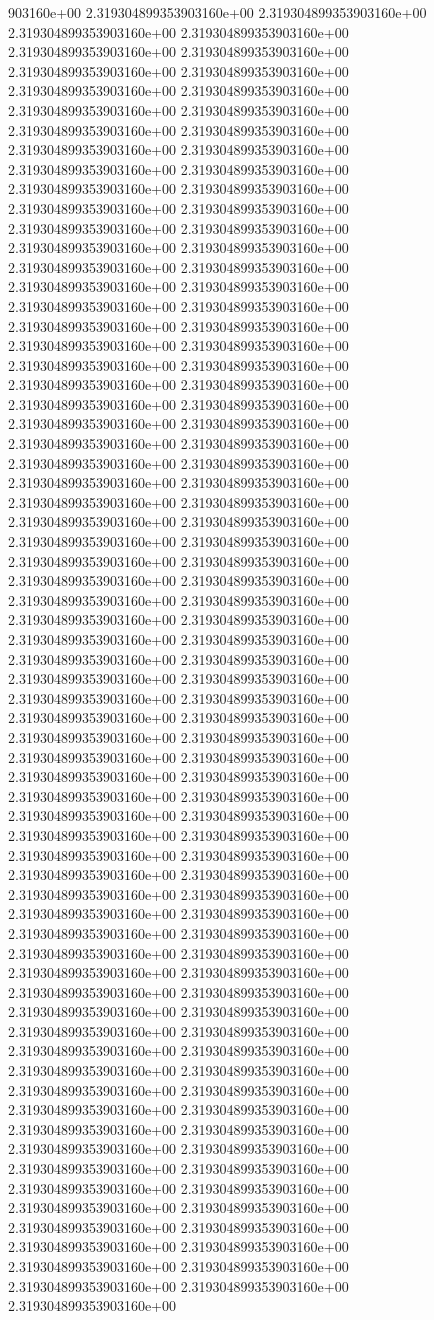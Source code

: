 903160e+00	2.319304899353903160e+00	2.319304899353903160e+00	2.319304899353903160e+00	2.319304899353903160e+00	2.319304899353903160e+00	2.319304899353903160e+00	2.319304899353903160e+00	2.319304899353903160e+00	2.319304899353903160e+00	2.319304899353903160e+00	2.319304899353903160e+00	2.319304899353903160e+00	2.319304899353903160e+00	2.319304899353903160e+00	2.319304899353903160e+00	2.319304899353903160e+00	2.319304899353903160e+00	2.319304899353903160e+00	2.319304899353903160e+00	2.319304899353903160e+00	2.319304899353903160e+00	2.319304899353903160e+00	2.319304899353903160e+00	2.319304899353903160e+00	2.319304899353903160e+00	2.319304899353903160e+00	2.319304899353903160e+00	2.319304899353903160e+00	2.319304899353903160e+00	2.319304899353903160e+00	2.319304899353903160e+00	2.319304899353903160e+00	2.319304899353903160e+00	2.319304899353903160e+00	2.319304899353903160e+00	2.319304899353903160e+00	2.319304899353903160e+00	2.319304899353903160e+00	2.319304899353903160e+00	2.319304899353903160e+00	2.319304899353903160e+00	2.319304899353903160e+00	2.319304899353903160e+00	2.319304899353903160e+00	2.319304899353903160e+00	2.319304899353903160e+00	2.319304899353903160e+00	2.319304899353903160e+00	2.319304899353903160e+00	2.319304899353903160e+00	2.319304899353903160e+00	2.319304899353903160e+00	2.319304899353903160e+00	2.319304899353903160e+00	2.319304899353903160e+00	2.319304899353903160e+00	2.319304899353903160e+00	2.319304899353903160e+00	2.319304899353903160e+00	2.319304899353903160e+00	2.319304899353903160e+00	2.319304899353903160e+00	2.319304899353903160e+00	2.319304899353903160e+00	2.319304899353903160e+00	2.319304899353903160e+00	2.319304899353903160e+00	2.319304899353903160e+00	2.319304899353903160e+00	2.319304899353903160e+00	2.319304899353903160e+00	2.319304899353903160e+00	2.319304899353903160e+00	2.319304899353903160e+00	2.319304899353903160e+00	2.319304899353903160e+00	2.319304899353903160e+00	2.319304899353903160e+00	2.319304899353903160e+00	2.319304899353903160e+00	2.319304899353903160e+00	2.319304899353903160e+00	2.319304899353903160e+00	2.319304899353903160e+00	2.319304899353903160e+00	2.319304899353903160e+00	2.319304899353903160e+00	2.319304899353903160e+00	2.319304899353903160e+00	2.319304899353903160e+00	2.319304899353903160e+00	2.319304899353903160e+00	2.319304899353903160e+00	2.319304899353903160e+00	2.319304899353903160e+00	2.319304899353903160e+00	2.319304899353903160e+00	2.319304899353903160e+00	2.319304899353903160e+00	2.319304899353903160e+00	2.319304899353903160e+00	2.319304899353903160e+00	2.319304899353903160e+00	2.319304899353903160e+00	2.319304899353903160e+00	2.319304899353903160e+00	2.319304899353903160e+00	2.319304899353903160e+00	2.319304899353903160e+00	2.319304899353903160e+00	2.319304899353903160e+00	2.319304899353903160e+00	2.319304899353903160e+00	2.319304899353903160e+00	2.319304899353903160e+00	2.319304899353903160e+00	2.319304899353903160e+00	2.319304899353903160e+00	2.319304899353903160e+00	2.319304899353903160e+00	2.319304899353903160e+00	2.319304899353903160e+00	2.319304899353903160e+00	2.319304899353903160e+00	2.319304899353903160e+00	2.319304899353903160e+00	2.319304899353903160e+00	2.319304899353903160e+00	2.319304899353903160e+00	2.319304899353903160e+00	2.319304899353903160e+00	2.319304899353903160e+00	2.319304899353903160e+00	